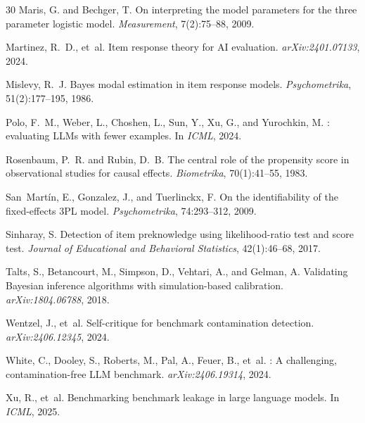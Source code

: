 \documentclass[letterpaper]{article}
\begin{document}
{\begin{thebibliography}{30}
Maris, G. and Bechger, T.
\newblock On interpreting the model parameters for the three parameter logistic model.
\newblock \emph{Measurement}, 7(2):75--88, 2009.

Martinez, R.~D., et~al.
\newblock Item response theory for {AI} evaluation.
\newblock \emph{arXiv:2401.07133}, 2024.

Mislevy, R.~J.
\newblock Bayes modal estimation in item response models.
\newblock \emph{Psychometrika}, 51(2):177--195, 1986.

Polo, F.~M., Weber, L., Choshen, L., Sun, Y., Xu, G., and Yurochkin, M.
: evaluating {LLMs} with fewer examples.
\newblock In \emph{ICML}, 2024.

Rosenbaum, P.~R. and Rubin, D.~B.
\newblock The central role of the propensity score in observational studies for causal effects.
\newblock \emph{Biometrika}, 70(1):41--55, 1983.

San~Mart\'in, E., Gonzalez, J., and Tuerlinckx, F.
\newblock On the identifiability of the fixed-effects 3{PL} model.
\newblock \emph{Psychometrika}, 74:293--312, 2009.

Sinharay, S.
\newblock Detection of item preknowledge using likelihood-ratio test and score test.
\newblock \emph{Journal of Educational and Behavioral Statistics}, 42(1):46--68, 2017.

Talts, S., Betancourt, M., Simpson, D., Vehtari, A., and Gelman, A.
\newblock Validating {Bayesian} inference algorithms with simulation-based calibration.
\newblock \emph{arXiv:1804.06788}, 2018.

Wentzel, J., et~al.
\newblock Self-critique for benchmark contamination detection.
\newblock \emph{arXiv:2406.12345}, 2024.

White, C., Dooley, S., Roberts, M., Pal, A., Feuer, B., et~al.
: A challenging, contamination-free {LLM} benchmark.
\newblock \emph{arXiv:2406.19314}, 2024.

Xu, R., et~al.
\newblock Benchmarking benchmark leakage in large language models.
\newblock In \emph{ICML}, 2025.


\end{thebibliography}}
\end{document}
